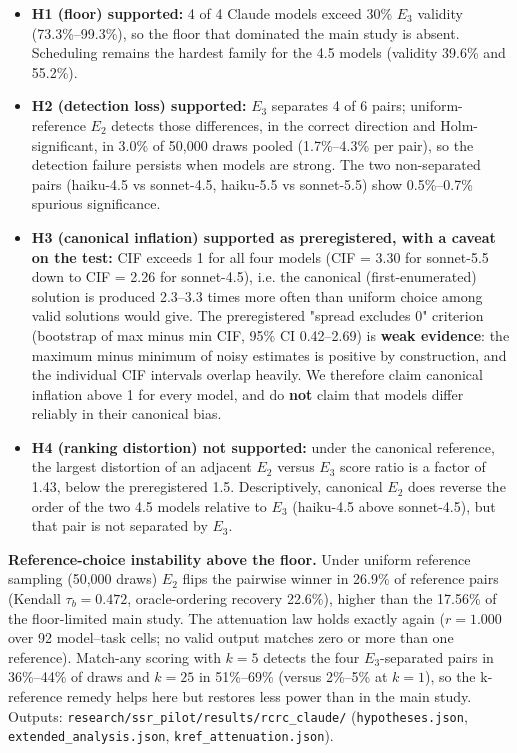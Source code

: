 \documentclass[11pt]{article}
\begin{document}
\begin{itemize}
\item \textbf{H1 (floor) supported:} 4 of 4 Claude models exceed 30\% $E_3$ validity (73.3\%--99.3\%), so the floor that dominated the main study is absent. Scheduling remains the hardest family for the 4.5 models (validity 39.6\% and 55.2\%).
\item \textbf{H2 (detection loss) supported:} $E_3$ separates 4 of 6 pairs; uniform-reference $E_2$ detects those differences, in the correct direction and Holm-significant, in 3.0\% of 50,000 draws pooled (1.7\%--4.3\% per pair), so the detection failure persists when models are strong. The two non-separated pairs (haiku-4.5 vs sonnet-4.5, haiku-5.5 vs sonnet-5.5) show 0.5\%--0.7\% spurious significance.
\item \textbf{H3 (canonical inflation) supported as preregistered, with a caveat on the test:} CIF exceeds 1 for all four models (CIF = 3.30 for sonnet-5.5 down to CIF = 2.26 for sonnet-4.5), i.e. the canonical (first-enumerated) solution is produced 2.3--3.3 times more often than uniform choice among valid solutions would give. The preregistered "spread excludes 0" criterion (bootstrap of max minus min CIF, 95\% CI 0.42--2.69) is \textbf{weak evidence}: the maximum minus minimum of noisy estimates is positive by construction, and the individual CIF intervals overlap heavily. We therefore claim canonical inflation above 1 for every model, and do \textbf{not} claim that models differ reliably in their canonical bias.
\item \textbf{H4 (ranking distortion) not supported:} under the canonical reference, the largest distortion of an adjacent $E_2$ versus $E_3$ score ratio is a factor of 1.43, below the preregistered 1.5. Descriptively, canonical $E_2$ does reverse the order of the two 4.5 models relative to $E_3$ (haiku-4.5 above sonnet-4.5), but that pair is not separated by $E_3$.
\end{itemize}
\textbf{Reference-choice instability above the floor.} Under uniform reference sampling (50,000 draws) $E_2$ flips the pairwise winner in 26.9\% of reference pairs (Kendall $\tau_b = 0.472$, oracle-ordering recovery 22.6\%), higher than the 17.56\% of the floor-limited main study. The attenuation law holds exactly again ($r = 1.000$ over 92 model--task cells; no valid output matches zero or more than one reference). Match-any scoring with $k = 5$ detects the four $E_3$-separated pairs in 36\%--44\% of draws and $k = 25$ in 51\%--69\% (versus 2\%--5\% at $k = 1$), so the k-reference remedy helps here but restores less power than in the main study. Outputs: \texttt{research/ssr\_pilot/results/rcrc\_claude/} (\texttt{hypotheses.json}, \texttt{extended\_analysis.json}, \texttt{kref\_attenuation.json}).
\end{document}
